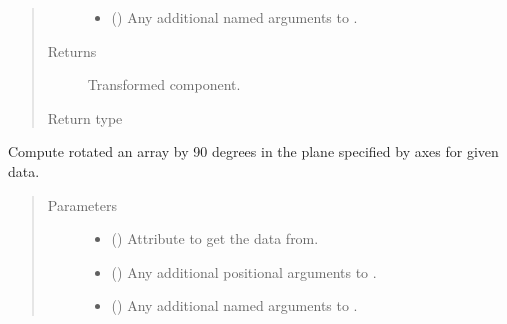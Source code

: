 \documentclass[letterpaper,10pt,english]{sphinxmanual}
\begin{document}
\begin{fulllineitems}
\begin{fulllineitems}
\begin{quote}
\begin{description}
\begin{itemize}
\item {} 
 () \textendash{} Any additional named arguments to .

\end{itemize}

\item[{Returns}] \leavevmode
{} \textendash{} Transformed component.

\item[{Return type}] \leavevmode
{\hyperref[\detokenize{api/base_classes:geology.src.base_spatial.SpatialComponent}]{}}

\end{description}\end{quote}

\end{fulllineitems}


\begin{fulllineitems}
\label{\detokenize{api/rock:geology.src.Rock.rot90}}
Compute rotated an array by 90 degrees in the plane specified by axes for given data.
\begin{quote}\begin{description}
\item[{Parameters}] \leavevmode\begin{itemize}
\item {} 
 (\sphinxstyleliteralemphasis{\sphinxupquote{, }}) \textendash{} Attribute to get the data from.

\item {} 
 () \textendash{} Any additional positional arguments to .

\item {} 
 () \textendash{} Any additional named arguments to .


\end{itemize}
\end{description}
\end{quote}
\end{fulllineitems}
\end{fulllineitems}
\end{document}
